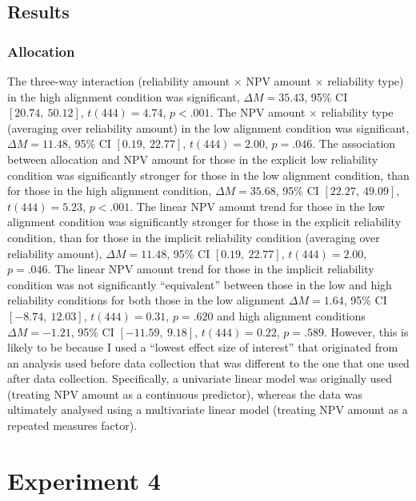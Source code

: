 \documentclass[a4paper, nobind, dvipsnames]{templates/ociamthesis}
\theoremstyle{definition}
\theoremstyle{definition}
\theoremstyle{definition}
\theoremstyle{definition}
\theoremstyle{remark}
\begin{document}
\subsection{Results}

\hypertarget{results-alignment-8-allocation}{%
\subsubsection{Allocation}\label{results-alignment-8-allocation}}

The three-way interaction
(reliability amount \(\times\) NPV amount \(\times\) reliability type) in the high
alignment condition was significant,
\(\Delta M = 35.43\), 95\% CI \([20.74,~50.12]\), \(t(444) = 4.74\), \(p < .001\). The NPV amount
\(\times\) reliability type (averaging over reliability amount) in the low
alignment condition was significant,
\(\Delta M = 11.48\), 95\% CI \([0.19,~22.77]\), \(t(444) = 2.00\), \(p = .046\). The association
between allocation and NPV amount for those in the explicit low reliability
condition was significantly stronger for those in the low alignment condition,
than for those in the high alignment condition,
\(\Delta M = 35.68\), 95\% CI \([22.27,~49.09]\), \(t(444) = 5.23\), \(p < .001\).
The linear NPV amount trend for those in the low alignment condition was
significantly stronger for those in the explicit reliability condition, than for
those in the implicit reliability condition (averaging over reliability amount),
\(\Delta M = 11.48\), 95\% CI \([0.19,~22.77]\), \(t(444) = 2.00\), \(p = .046\). The linear
NPV amount trend for those in the implicit reliability condition was not
significantly ``equivalent'' between those in the low and high reliability
conditions for both those in the low alignment
\(\Delta M = 1.64\), 95\% CI \([-8.74,~12.03]\), \(t(444) = 0.31\), \(p = .620\)
and high alignment conditions
\(\Delta M = -1.21\), 95\% CI \([-11.59,~9.18]\), \(t(444) = 0.22\), \(p = .589\).
However, this is likely to be because I used a ``lowest effect size of interest''
that originated from an analysis used before data collection that was different
to the one that one used after data collection. Specifically, a univariate
linear model was originally used (treating NPV amount as a continuous
predictor), whereas the data was ultimately analysed using a multivariate linear
model (treating NPV amount as a repeated measures factor).

\hypertarget{alignment-1}{%
\section{Experiment 4}\label{alignment-1}}
\end{document}
